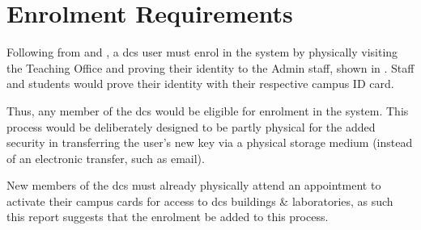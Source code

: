 \section{Enrolment Requirements}
\label{sec:analysis_enrolment}

Following from  and , a \acrfull{dcs} user must enrol in the \theResServer system by physically visiting the Teaching Office and proving their identity to the Admin staff, shown in . Staff and students would prove their identity with their respective campus ID card.

Thus, any member of the \acrfull{dcs} would be eligible for enrolment in the system. This process would be deliberately designed to be partly physical for the added security in transferring the user's new key via a physical storage medium (instead of an electronic transfer, such as email).

New members of the \acrshort{dcs} must already physically attend an appointment to activate their campus cards for access to \acrshort{dcs} buildings \& laboratories, as such this report suggests that the \theResServer enrolment be added to this process.
